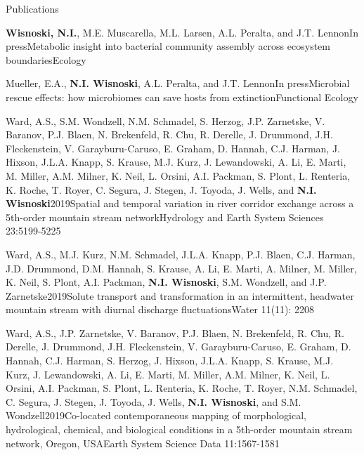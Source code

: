 \documentclass{resume} %
\begin{document}
\begin{rhangSection}{Publications}

\begin{Publication}{{\bf Wisnoski, N.I.}, M.E. Muscarella, M.L. Larsen, A.L. Peralta, and J.T. Lennon}{In press}{Metabolic insight into bacterial community assembly across ecosystem boundaries}{Ecology}
\end{Publication}

\begin{Publication}{Mueller, E.A., {\bf N.I. Wisnoski}, A.L. Peralta, and J.T. Lennon}{In press}{Microbial rescue effects: how microbiomes can save hosts from extinction}{Functional Ecology}
\end{Publication}

\begin{Publication}{Ward, A.S., S.M. Wondzell, N.M. Schmadel, S. Herzog, J.P. Zarnetske, V. Baranov, P.J. Blaen, N. Brekenfeld, R. Chu, R. Derelle, J. Drummond, J.H. Fleckenstein, V. Garayburu-Caruso, E. Graham, D. Hannah, C.J. Harman, J. Hixson, J.L.A. Knapp, S. Krause, M.J. Kurz, J. Lewandowski, A. Li, E. Marti, M. Miller, A.M. Milner, K. Neil, L. Orsini, A.I. Packman, S. Plont, L. Renteria, K. Roche, T. Royer, C. Segura, J. Stegen, J. Toyoda, J. Wells, and {\bf N.I. Wisnoski}}{2019}{Spatial and temporal variation in river corridor exchange across a 5th-order mountain stream network}{Hydrology and Earth System Sciences 23:5199-5225} 
\end{Publication}

\begin{Publication}{Ward, A.S., M.J. Kurz, N.M. Schmadel, J.L.A. Knapp, P.J. Blaen, C.J. Harman, J.D. Drummond, D.M. Hannah, S. Krause, A. Li, E. Marti, A. Milner, M. Miller, K. Neil, S. Plont, A.I. Packman, {\bf N.I. Wisnoski}, S.M. Wondzell, and J.P. Zarnetske}{2019}{Solute transport and transformation in an intermittent, headwater mountain stream with diurnal discharge fluctuations}{Water 11(11): 2208}
\end{Publication}

\begin{Publication}{Ward, A.S., J.P. Zarnetske, V. Baranov, P.J. Blaen, N. Brekenfeld, R. Chu, R. Derelle, J. Drummond, J.H. Fleckenstein, V. Garayburu-Caruso, E. Graham, D. Hannah, C.J. Harman, S. Herzog, J. Hixson, J.L.A. Knapp, S. Krause, M.J. Kurz, J. Lewandowski, A. Li, E. Marti, M. Miller, A.M. Milner, K. Neil, L. Orsini, A.I. Packman, S. Plont, L. Renteria, K. Roche, T. Royer, N.M. Schmadel, C. Segura, J. Stegen, J. Toyoda, J. Wells, {\bf N.I. Wisnoski}, and S.M. Wondzell}{2019}{Co-located contemporaneous mapping of morphological, hydrological, chemical, and biological conditions in a 5th-order mountain stream network, Oregon, USA}{Earth System Science Data 11:1567-1581}
\end{Publication}


\end{rhangSection}
\end{document}
